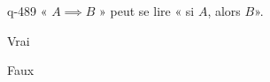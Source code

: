 \begin{truefalse}{q-489}
« $A \implies B$ » peut se lire « si $A$, alors $B$».
\item* Vrai
\item Faux
\end{truefalse}


